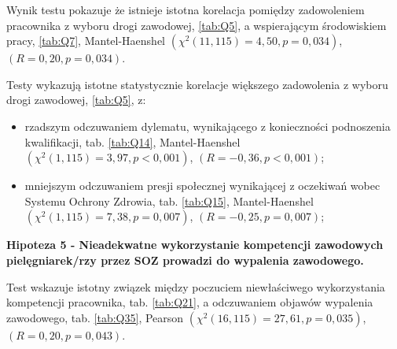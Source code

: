 \documentclass[a4paper,12pt,twoside,openright]{mwrep}
\begin{document}
Wynik testu pokazuje że istnieje istotna korelacja pomiędzy zadowoleniem pracownika z wyboru drogi zawodowej, \ref{tab:Q5}, a wspierającym środowiskiem pracy, \ref{tab:Q7}, Mantel-Haenshel $(\chi^2 (11, 115) = 4,50, p=0,034)$, $(R = 0,20, p = 0,034)$.

Testy wykazują istotne statystycznie korelacje większego zadowolenia z wyboru drogi zawodowej, \ref{tab:Q5}, z:
	\begin{itemize}
		\item rzadszym odczuwaniem dylematu, wynikającego z konieczności podnoszenia kwalifikacji, tab. \ref{tab:Q14}, Mantel-Haenshel $(\chi^2 (1, 115) = 3,97, p < 0,001)$, $(R = -0,36, p < 0,001)$;
		\item mniejszym odczuwaniem presji społecznej wynikającej z oczekiwań wobec Systemu Ochrony Zdrowia, tab. \ref{tab:Q15}, Mantel-Haenshel $(\chi^2 (1, 115) = 7,38, p = 0,007)$, $(R = -0,25, p = 0,007)$;
	\end{itemize}

  
  


 	
	


   
	

\vspace{\baselineskip} 
\textbf{Hipoteza 5 - Nieadekwatne wykorzystanie kompetencji zawodowych pielęgniarek/rzy  przez SOZ prowadzi do wypalenia zawodowego.}
\vspace{\baselineskip}





Test wskazuje  istotny związek między poczuciem niewłaściwego wykorzystania kompetencji pracownika, tab. \ref{tab:Q21}, a odczuwaniem objawów wypalenia zawodowego, tab. \ref{tab:Q35}, Pearson $(\chi^2 (16, 115) = 27,61, p = 0,035)$, $(R = 0,20, p = 0,043)$.
\end{document}
